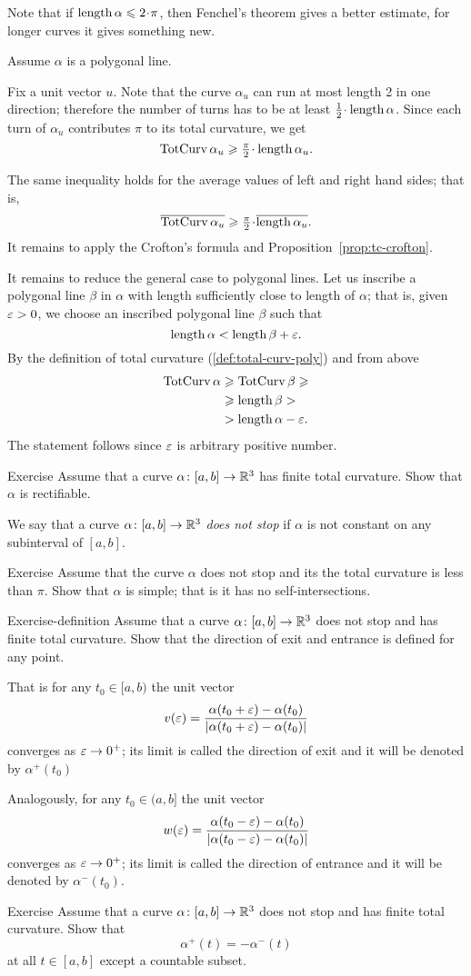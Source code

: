 Note that if $\length\alpha\le2\cdot\pi$, then Fenchel's theorem gives a better estimate,
for longer curves it gives something new.

Assume $\alpha$ is a polygonal line.

Fix a unit vector $u$.
Note that the curve $\alpha_u$ can run at most length 2 in one direction;
therefore the number of turns has to be at least $\tfrac12\cdot\length\alpha$.
Since each turn of $\alpha_u$ contributes $\pi$ to its total curvature, we get
\[\tc\alpha_u\ge \tfrac\pi2\cdot\length\alpha_u.\]

The same inequality holds for the average values of left and right hand sides;
that is,
\[\overline{\tc\alpha_u}
\ge \tfrac\pi2\cdot\overline{\length\alpha_u}.\]
It remains to apply the Crofton's formula and Proposition~\ref{prop:tc-crofton}.

It remains to reduce the general case to polygonal lines.
Let us inscribe a polygonal line $\beta$ in $\alpha$ with length sufficiently close to length of $\alpha$;
that is, given $\varepsilon>0$, we choose an inscribed polygonal line $\beta$ such that 
\[\mathop{\rm length}\nolimits \alpha<\mathop{\rm length}\nolimits \beta+\varepsilon.\]
By the definition of total curvature (\ref{def:total-curv-poly}) and from above
\begin{align*}
\mathop{\rm TotCurv}\nolimits\alpha&\geqslant\mathop{\rm TotCurv}\nolimits\beta\geqslant
\\
&\geqslant \mathop{\rm length}\nolimits\beta>
\\
&>\mathop{\rm length}\nolimits\alpha-\varepsilon.
\end{align*}
The statement follows since $\varepsilon$ is arbitrary positive number. 
\qeds

\begin{thm}{Exercise} 
Assume that a curve $\alpha\colon[a,b]\to\mathbb{R}^3$ has finite total curvature.
 Show that $\alpha$ is rectifiable.
\end{thm}

We say that a curve $\alpha\colon[a,b]\to\mathbb{R}^3$ \emph{does not stop} if $\alpha$ is not constant on any subinterval of $[a,b]$. 

\begin{thm}{Exercise} 
Assume that the curve $\alpha$ does not stop and its the total curvature is less than $\pi$.
Show that $\alpha$ is simple; that is it has no self-intersections.
\end{thm}

\begin{thm}{Exercise-definition} 
Assume that a curve $\alpha\colon[a,b]\to\mathbb{R}^3$ does not stop and has finite total curvature.
Show that the direction of exit and entrance is defined for any point.

That is for any $t_0\in [a,b)$ the unit vector  
\[v(\varepsilon)=\frac{\alpha(t_0+\varepsilon)-\alpha(t_0)}{|\alpha(t_0+\varepsilon)-\alpha(t_0)|}\] converges as $\varepsilon\to0^+$;
its limit is called the direction of exit and it will be denoted by $\alpha^+(t_0)$

Analogously, for any $t_0\in (a,b]$ the unit vector  
\[w(\varepsilon)=\frac{\alpha(t_0-\varepsilon)-\alpha(t_0)}{|\alpha(t_0-\varepsilon)-\alpha(t_0)|}\] 
converges as $\varepsilon\to0^+$;
its limit is called the direction of entrance and it will be denoted by $\alpha^-(t_0)$.
\end{thm}

\begin{thm}{Exercise} 
Assume that a curve $\alpha\colon[a,b]\to\mathbb{R}^3$ does not stop and has finite total curvature.
Show that 
\[\alpha^+(t)=-\alpha^-(t)\]
at all $t\in[a,b]$ except a countable subset.
\end{thm}


